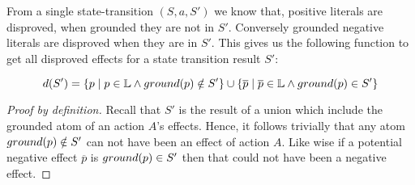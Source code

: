 \documentclass[../Master.tex]{subfiles}
\begin{document}
\begin{theorem}
	 From a single state-transition $(S,a,S')$ we know that,
	positive literals are disproved, when grounded they are not in $S'$. Conversely grounded negative literals are disproved when they are in $S'$. This gives us the following function to get all disproved effects for a state transition result $S'$:
	
	\begin{equation*}
		 d(S') = \left\{
			p \mid p \in \mathbb{L} \land ground (p) \notin S'
			\right\} 
			\cup
			 \left\{
			\overline{p} \mid \overline{p} \in \mathbb{L} \land ground(p) \in S'
			\right\}
	\end{equation*}
	\begin{proof}[Proof by definition]
		Recall that $S'$ is the result of a union which include the grounded atom of an action $A$'s effects. Hence, it follows trivially that any atom $ground(p) \notin S'$ can not have been an effect of action $A$.
	Like wise if a potential negative effect $\overline{p}$ is $ground(p) \in S'$ then that could not have been a negative effect.
	\end{proof}
\end{theorem}
\end{document}
